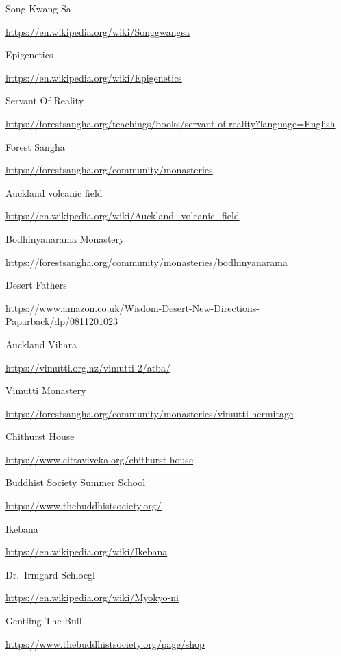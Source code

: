 \begin{thebibliography}{9}
 Song Kwang Sa

  {\urlsize \url{https://en.wikipedia.org/wiki/Songgwangsa}}

 Epigenetics

  {\urlsize \url{https://en.wikipedia.org/wiki/Epigenetics}}

 Servant Of Reality

  {\urlsize \url{https://forestsangha.org/teachings/books/servant-of-reality?language=English}}

 Forest Sangha

  {\urlsize \url{https://forestsangha.org/community/monasteries}}

 Auckland volcanic field

  {\urlsize \url{https://en.wikipedia.org/wiki/Auckland_volcanic_field}}

 Bodhinyanarama Monastery

  {\urlsize \url{https://forestsangha.org/community/monasteries/bodhinyanarama}}

 Desert Fathers

  {\urlsize \url{https://www.amazon.co.uk/Wisdom-Desert-New-Directions-Paparback/dp/0811201023}}

 Auckland Vihara

  {\urlsize \url{https://vimutti.org.nz/vimutti-2/atba/}}

 Vimutti Monastery

  {\urlsize \url{https://forestsangha.org/community/monasteries/vimutti-hermitage}}

 Chithurst House

  {\urlsize \url{https://www.cittaviveka.org/chithurst-house}}

 Buddhist Society Summer School

  {\urlsize \url{https://www.thebuddhistsociety.org/}}

 Ikebana

  {\urlsize \url{https://en.wikipedia.org/wiki/Ikebana}}

 Dr.~Irmgard Schloegl

  {\urlsize \url{https://en.wikipedia.org/wiki/Myokyo-ni}}

 Gentling The Bull

  {\urlsize \url{https://www.thebuddhistsociety.org/page/shop}}


\end{thebibliography}
